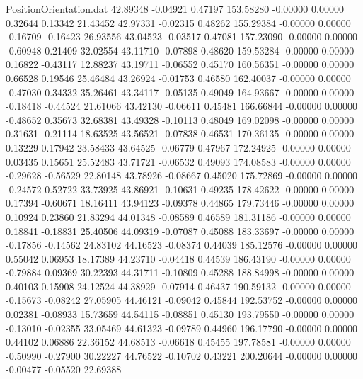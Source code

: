 \begin{filecontents}{PositionOrientation.dat}
  42.89348   -0.04921    0.47197   153.58280   -0.00000    0.00000    0.32644    0.13342   21.43452
  42.97331   -0.02315    0.48262   155.29384   -0.00000    0.00000   -0.16709   -0.16423   26.93556
  43.04523   -0.03517    0.47081   157.23090   -0.00000    0.00000   -0.60948    0.21409   32.02554
  43.11710   -0.07898    0.48620   159.53284   -0.00000    0.00000    0.16822   -0.43117   12.88237
  43.19711   -0.06552    0.45170   160.56351   -0.00000    0.00000    0.66528    0.19546   25.46484
  43.26924   -0.01753    0.46580   162.40037   -0.00000    0.00000   -0.47030    0.34332   35.26461
  43.34117   -0.05135    0.49049   164.93667   -0.00000    0.00000   -0.18418   -0.44524   21.61066
  43.42130   -0.06611    0.45481   166.66844   -0.00000    0.00000   -0.48652    0.35673   32.68381
  43.49328   -0.10113    0.48049   169.02098   -0.00000    0.00000    0.31631   -0.21114   18.63525
  43.56521   -0.07838    0.46531   170.36135   -0.00000    0.00000    0.13229    0.17942   23.58433
  43.64525   -0.06779    0.47967   172.24925   -0.00000    0.00000    0.03435    0.15651   25.52483
  43.71721   -0.06532    0.49093   174.08583   -0.00000    0.00000   -0.29628   -0.56529   22.80148
  43.78926   -0.08667    0.45020   175.72869   -0.00000    0.00000   -0.24572    0.52722   33.73925
  43.86921   -0.10631    0.49235   178.42622   -0.00000    0.00000    0.17394   -0.60671   18.16411
  43.94123   -0.09378    0.44865   179.73446   -0.00000    0.00000    0.10924    0.23860   21.83294
  44.01348   -0.08589    0.46589   181.31186   -0.00000    0.00000    0.18841   -0.18831   25.40506
  44.09319   -0.07087    0.45088   183.33697   -0.00000    0.00000   -0.17856   -0.14562   24.83102
  44.16523   -0.08374    0.44039   185.12576   -0.00000    0.00000    0.55042    0.06953   18.17389
  44.23710   -0.04418    0.44539   186.43190   -0.00000    0.00000   -0.79884    0.09369   30.22393
  44.31711   -0.10809    0.45288   188.84998   -0.00000    0.00000    0.40103    0.15908   24.12524
  44.38929   -0.07914    0.46437   190.59132   -0.00000    0.00000   -0.15673   -0.08242   27.05905
  44.46121   -0.09042    0.45844   192.53752   -0.00000    0.00000    0.02381   -0.08933   15.73659
  44.54115   -0.08851    0.45130   193.79550   -0.00000    0.00000   -0.13010   -0.02355   33.05469
  44.61323   -0.09789    0.44960   196.17790   -0.00000    0.00000    0.44102    0.06886   22.36152
  44.68513   -0.06618    0.45455   197.78581   -0.00000    0.00000   -0.50990   -0.27900   30.22227
  44.76522   -0.10702    0.43221   200.20644   -0.00000    0.00000   -0.00477   -0.05520   22.69388

\end{filecontents}
